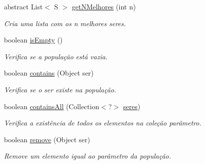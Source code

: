 \begin{DoxyCompactItemize}
abstract List$<$ S $>$ \hyperlink{classic_1_1populacional_1_1_populacao_3_01_g_01extends_01_number_01_6_comparable_3_01_g_01_4_00_506237fa66af7bbd01f529b68d4beaca_acedbe86a5230401a6a6563af55ac94a0}{get\-N\-Melhores} (int n)
\begin{DoxyCompactList}\small\item\em Cria uma lista com os {\itshape n} melhores seres. \end{DoxyCompactList}\item 
boolean \hyperlink{classic_1_1populacional_1_1_populacao_3_01_g_01extends_01_number_01_6_comparable_3_01_g_01_4_00_506237fa66af7bbd01f529b68d4beaca_a1d96da8d70618b6af6bff59c1c5732d7}{is\-Empty} ()
\begin{DoxyCompactList}\small\item\em Verifica se a população está vazia. \end{DoxyCompactList}\item 
boolean \hyperlink{classic_1_1populacional_1_1_populacao_3_01_g_01extends_01_number_01_6_comparable_3_01_g_01_4_00_506237fa66af7bbd01f529b68d4beaca_aad5741e72c7f13742773db65e4632a6e}{contains} (Object ser)
\begin{DoxyCompactList}\small\item\em Verifica se o ser existe na população. \end{DoxyCompactList}\item 
boolean \hyperlink{classic_1_1populacional_1_1_populacao_3_01_g_01extends_01_number_01_6_comparable_3_01_g_01_4_00_506237fa66af7bbd01f529b68d4beaca_ab818a8582b19b47f32efce1943e2ddae}{contains\-All} (Collection$<$?$>$ \hyperlink{classic_1_1populacional_1_1_populacao_3_01_g_01extends_01_number_01_6_comparable_3_01_g_01_4_00_506237fa66af7bbd01f529b68d4beaca_a95b7dbe0db4e648740672366ee01877f}{seres})
\begin{DoxyCompactList}\small\item\em Verifica a existência de todos os elementos na coleção parâmetro. \end{DoxyCompactList}\item 
boolean \hyperlink{classic_1_1populacional_1_1_populacao_3_01_g_01extends_01_number_01_6_comparable_3_01_g_01_4_00_506237fa66af7bbd01f529b68d4beaca_ac71cb30ee867b21a7540e78547933b4b}{remove} (Object ser)
\begin{DoxyCompactList}\small\item\em Remove um elemento igual ao parâmetro da população. \end{DoxyCompactList}\item 

\end{DoxyCompactItemize}
